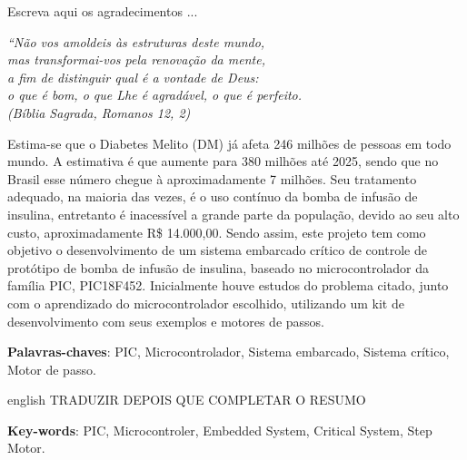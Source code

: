 \documentclass[	12pt, Times, openright, twoside, a4paper, english, brazil]{abntex2}
\begin{document}
\begin{agradecimentos}
Escreva aqui os agradecimentos ...

\end{agradecimentos}

\begin{epigrafe}
    \vspace*{\fill}
	\begin{flushright}
		\textit{``Não vos amoldeis às estruturas deste mundo, \\
		mas transformai-vos pela renovação da mente, \\
		a fim de distinguir qual é a vontade de Deus: \\
		o que é bom, o que Lhe é agradável, o que é perfeito.\\
		(Bíblia Sagrada, Romanos 12, 2)}
	\end{flushright}
\end{epigrafe}


\begin{resumo}
Estima-se que o Diabetes Melito (DM) já afeta 246 milhões de pessoas em todo mundo. A estimativa é que aumente para 380 milhões até 2025, sendo que no Brasil esse número chegue à aproximadamente 7 milhões. Seu tratamento adequado, na maioria das vezes, é o uso contínuo da bomba de infusão de insulina, entretanto é inacessível a grande parte da população, devido ao seu alto custo, aproximadamente R\$ 14.000,00. Sendo assim, este projeto tem como objetivo o desenvolvimento de um sistema embarcado crítico de controle de protótipo de bomba de infusão de insulina, baseado no microcontrolador da família PIC, PIC18F452.
Inicialmente houve estudos do problema citado, junto com o aprendizado do microcontrolador escolhido, utilizando um kit de desenvolvimento com seus exemplos e motores de passos. 

 
 \vspace{\onelineskip}
    
 \noindent
 \textbf{Palavras-chaves}: PIC, Microcontrolador, Sistema embarcado, Sistema crítico, Motor de passo.
\end{resumo}

\begin{resumo}[Abstract]
 \begin{otherlanguage*}{english}
TRADUZIR DEPOIS QUE COMPLETAR O RESUMO

   \vspace{\onelineskip}
 
   \noindent 
   \textbf{Key-words}: PIC, Microcontroler, Embedded System, Critical System, Step Motor.
 \end{otherlanguage*}
\end{resumo}
\end{document}
